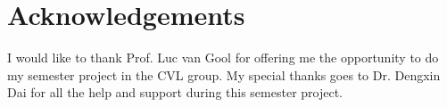 %


\newpage

\chapter*{Acknowledgements}
I would like to thank Prof. Luc van Gool for offering me the opportunity to do my semester project in the CVL group. My special thanks goes to Dr. Dengxin Dai for all the help and support during this semester project.
